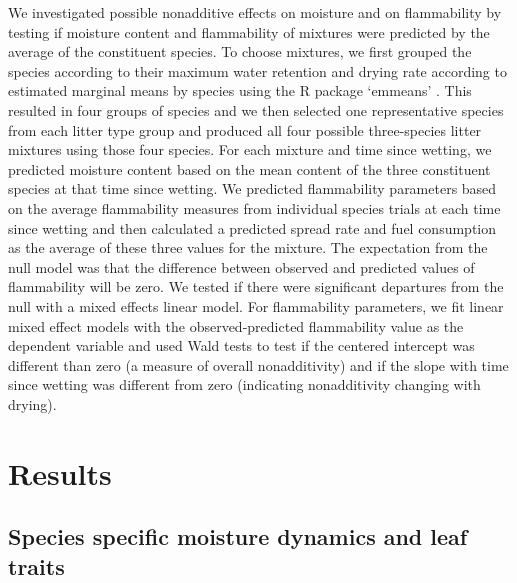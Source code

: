 \documentclass[letterpaper,12pt]{article}
\begin{document}
We investigated possible nonadditive effects on moisture and on flammability by
testing if moisture content and flammability of mixtures were predicted by the
average of the constituent species. To choose mixtures, we first grouped the
species according to their maximum water retention and drying rate according to
estimated marginal means by species using the R package `emmeans'
\citep{Lenth-2019}. This resulted in four groups of species and we then
selected one representative species from each litter type group and produced
all four possible three-species litter mixtures using those four species. For
each mixture and time since wetting, we predicted moisture content based on the
mean content of the three constituent species at that time since wetting. We
predicted flammability parameters based on the average flammability measures
from individual species trials at each time since wetting and then calculated a
predicted spread rate and fuel consumption as the average of these three values
for the mixture. The expectation from the null model was that the difference
between observed and predicted values of flammability will be zero. We tested
if there were significant departures from the null with a mixed effects linear
model. For flammability parameters, we fit linear mixed effect models with the
observed-predicted flammability value as the dependent variable and used Wald
tests to test if the centered intercept was different than zero (a measure of
overall nonadditivity) and if the slope with time since wetting was different
from zero (indicating nonadditivity changing with drying).

\section*{Results}

\subsection*{Species specific moisture dynamics and leaf traits}
\end{document}
